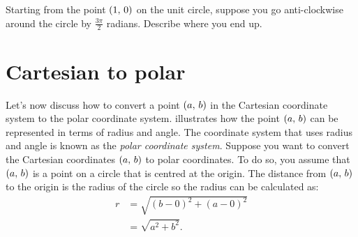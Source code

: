 \documentclass[a4paper,oneside,12pt]{article}
\begin{document}
\begin{exercise}
Starting from the point $\left\lparen{1},\, {0}\right\rparen$ on the unit circle, suppose you
go anti-clockwise around the circle by $\frac{3\pi}{2}$ radians.
Describe where you end up.
\end{exercise}



\section{Cartesian to polar}

Let's now discuss how to convert a point $\left\lparen{a},\, {b}\right\rparen$ in the
Cartesian coordinate system to the polar coordinate system.
 illustrates
how the point $\left\lparen{a},\, {b}\right\rparen$ can be represented in terms of radius and
angle.  The coordinate system that uses radius and angle is known as
the \emph{polar coordinate system}.  Suppose you want to convert the
Cartesian coordinates $\left\lparen{a},\, {b}\right\rparen$ to polar coordinates.  To do so,
you assume that $\left\lparen{a},\, {b}\right\rparen$ is a point on a circle that is centred
at the origin.  The distance from $\left\lparen{a},\, {b}\right\rparen$ to the origin is the
radius of the circle so the radius can be calculated as:
\begin{align*}
r
&=
\sqrt{
  (b - 0)^2 + (a - 0)^2
} \\[4pt]
&=
\sqrt{
  a^2 + b^2
}.
\end{align*}
\end{document}

